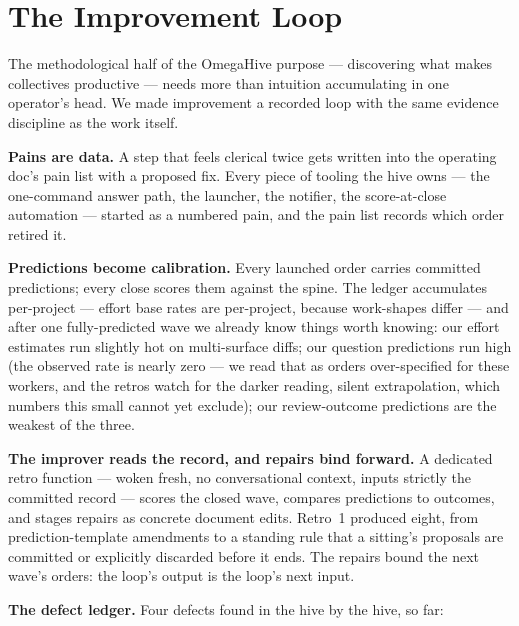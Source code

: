 \section{The Improvement Loop}

The methodological half of the OmegaHive purpose --- discovering what makes collectives productive --- needs more than intuition accumulating in one operator's head. We made improvement a recorded loop with the same evidence discipline as the work itself.

\textbf{Pains are data.} A step that feels clerical twice gets written into the operating doc's pain list with a proposed fix. Every piece of tooling the hive owns --- the one-command answer path, the launcher, the notifier, the score-at-close automation --- started as a numbered pain, and the pain list records which order retired it.

\textbf{Predictions become calibration.} Every launched order carries committed predictions; every close scores them against the spine. The ledger accumulates per-project --- effort base rates are per-project, because work-shapes differ --- and after one fully-predicted wave we already know things worth knowing: our effort estimates run slightly hot on multi-surface diffs; our question predictions run high (the observed rate is nearly zero --- we read that as orders over-specified for these workers, and the retros watch for the darker reading, silent extrapolation, which numbers this small cannot yet exclude); our review-outcome predictions are the weakest of the three.

\textbf{The improver reads the record, and repairs bind forward.} A dedicated retro function --- woken fresh, no conversational context, inputs strictly the committed record --- scores the closed wave, compares predictions to outcomes, and stages repairs as concrete document edits. Retro~1 produced eight, from prediction-template amendments to a standing rule that a sitting's proposals are committed or explicitly discarded before it ends. The repairs bound the next wave's orders: the loop's output is the loop's next input.

\textbf{The defect ledger.} Four defects found in the hive by the hive, so far:

